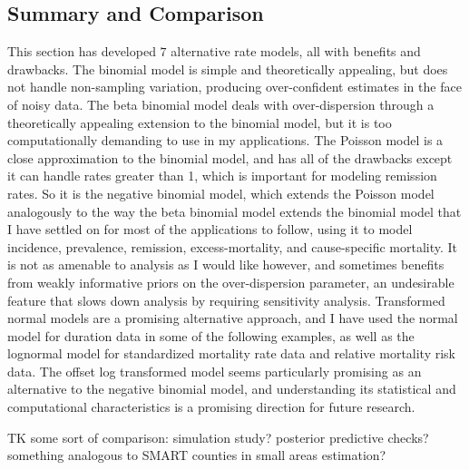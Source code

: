 \subsection{Summary and Comparison}
This section has developed $7$ alternative rate models, all with
benefits and drawbacks.  The binomial model is simple and
theoretically appealing, but does not handle non-sampling variation,
producing over-confident estimates in the face of noisy data.  The
beta binomial model deals with over-dispersion through a theoretically
appealing extension to the binomial model, but it is too
computationally demanding to use in my applications.  The Poisson
model is a close approximation to the binomial model, and has all of
the drawbacks except it can handle rates greater than 1, which is
important for modeling remission rates.  So it is the negative
binomial model, which extends the Poisson model analogously to the way
the beta binomial model extends the binomial model that I have settled
on for most of the applications to follow, using it to model
incidence, prevalence, remission, excess-mortality, and cause-specific
mortality. It is not as amenable to analysis as I would like however,
and sometimes benefits from weakly informative priors on the
over-dispersion parameter, an undesirable feature that slows down
analysis by requiring sensitivity analysis.  Transformed normal models
are a promising alternative approach, and I have used the normal model
for duration data in some of the following examples, as well as the
lognormal model for standardized mortality rate data and relative
mortality risk data. The offset log transformed model seems
particularly promising as an alternative to the negative binomial
model, and understanding its statistical and computational
characteristics is a promising direction for future research.

TK some sort of comparison: simulation study? posterior predictive
checks? something analogous to SMART counties in small areas
estimation?
